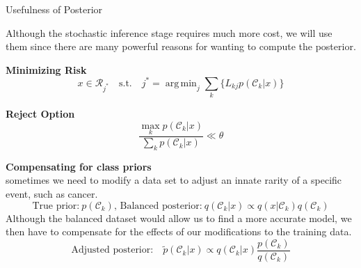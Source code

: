 \documentclass{bredelebeamer}
\DeclareMathOperator*{\argmin}{arg\,min}
\begin{document}
\begin{frame}{Usefulness of Posterior}
  \begin{justify}
    Although the stochastic inference stage requires much more cost, we will use
    them since there are many powerful reasons for wanting to compute the posterior.

    \vspace{0.5\baselineskip}
    \textbf{Minimizing Risk}
    \begin{equation}
      x \in \mathcal{R}_{j^*} \quad \textrm{s.t.} \quad j^*
      = \argmin_j \sum_k \{L_{kj} p(\mathcal{C}_k | x)\}
    \end{equation}

    \textbf{Reject Option}
    \begin{equation}
      \frac{\max_k p(\mathcal{C}_k|x)}{\sum_{k} p(\mathcal{C}_k|x)} \ll \theta
    \end{equation}

    \textbf{Compensating for class priors} \\
    sometimes we need to modify a data set to adjust an innate rarity of a specific
    event, such as cancer.
    \begin{equation}
        \textrm{True prior:}\: p(\mathcal{C}_k),\,
        \textrm{Balanced posterior:}\: q(\mathcal{C}_k|x) \propto q(x|\mathcal{C}_k) q(\mathcal{C}_k)
    \end{equation}
    Although the balanced dataset would allow us to find a more accurate model, we
    then have to compensate for the effects of our modifications to the training data.
    \begin{equation}
      \textrm{Adjusted posterior:} \quad \tilde{p}(\mathcal{C}_k|x) \propto q(\mathcal{C}_k|x) \frac{p(\mathcal{C}_k)}{q(\mathcal{C}_k)}
    \end{equation}
  \end{justify}
\end{frame}
\end{document}
